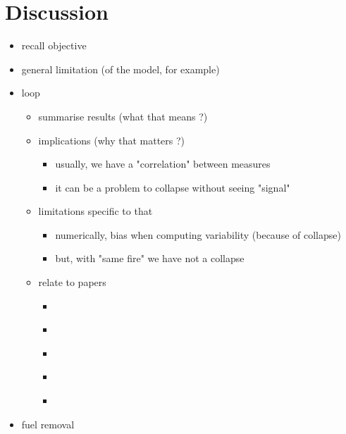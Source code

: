 \documentclass{article}
\begin{document}
\newpage
\section{Discussion}



\begin{itemize}
    \item recall objective
    \item general limitation (of the model, for example)
    \item loop
    \begin{itemize}
        \item summarise results (what that means ?)
        \item implications (why that matters ?)
        \begin{itemize}
            \item usually, we have a "correlation" between measures
            \item it can be a problem to collapse without seeing "signal"
        \end{itemize}
        \item limitations specific to that
        \begin{itemize}
            \item numerically, bias when computing variability (because of collapse) 
            \item but, with "same fire" we have not a collapse
        \end{itemize}
        \item relate to papers
        \begin{itemize}
            \item \cite{brock_variance_2006}
            \item \cite{carpenter2006rising}
            \item \cite{scheffer2015generic}
            \item \cite{dakos_robustness_2012}
            \item \cite{biggs_turning_2009}
        \end{itemize}
    \end{itemize}
    \item fuel removal

\end{itemize}
\end{document}
